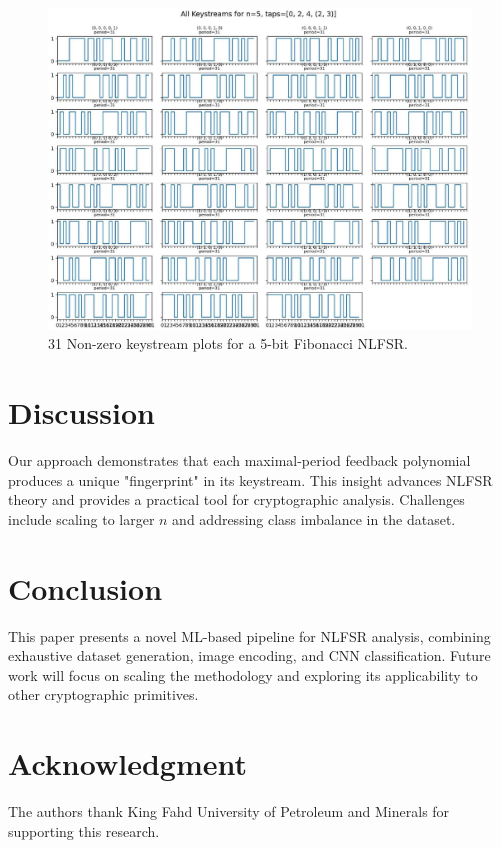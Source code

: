 \documentclass[conference]{IEEEtran}
\begin{document}
\begin{figure}[ht]
  \centering
  \includegraphics[max width=\columnwidth]{keystreams.jpg}
  \caption{31 Non-zero keystream plots for a 5-bit Fibonacci NLFSR.}
  \label{fig:keystreams}
\end{figure}

\section{Discussion}
Our approach demonstrates that each maximal-period feedback polynomial produces a unique "fingerprint" in its keystream. This insight advances NLFSR theory and provides a practical tool for cryptographic analysis. Challenges include scaling to larger $n$ and addressing class imbalance in the dataset.

\section{Conclusion}
This paper presents a novel ML-based pipeline for NLFSR analysis, combining exhaustive dataset generation, image encoding, and CNN classification. Future work will focus on scaling the methodology and exploring its applicability to other cryptographic primitives.

\section*{Acknowledgment}
The authors thank King Fahd University of Petroleum and Minerals for supporting this research.



\end{document}
